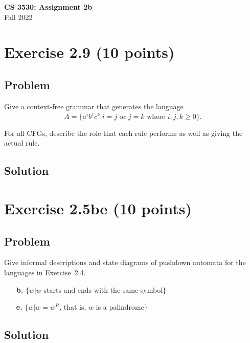 \documentclass{article}
\begin{document}
\begin{empfile}

\begin{center}
\textbf{\Large CS 3530: Assignment 2b} \\[2mm]
Fall 2022
\end{center}

\raggedright


\section*{Exercise 2.9 (10 points)}

\subsection*{Problem}

Give a context-free grammar that generates the language
$$
A=\{a^ib^jc^k|i=j\text{ or }j=k\text{ where }i,j,k\geq 0\}.
$$

For all CFGs, describe the role that each rule performs as well as
giving the actual rule.

\subsection*{Solution}



\section*{Exercise 2.5be (10 points)}

\subsection*{Problem}

Give informal descriptions and state diagrams of pushdown automata
for the languages in Exercise~2.4.

\begin{enumerate}
\item[\textbf{b.}] $\{w|w$ starts and ends with the same symbol$\}$
\item[\textbf{e.}] $\{w|w = w^R$, that is, $w$ is a palindrome$\}$
\end{enumerate}

\subsection*{Solution}


\end{empfile}
\immediate{}
\end{document}
